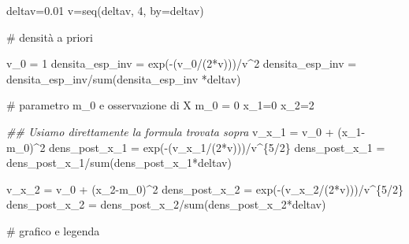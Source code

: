 \documentclass[
  italian,
  letterpaper,
]{book}
\newenvironment{Shaded}{\begin{snugshade}}{\end{snugshade}}
\newcommand{\AttributeTok}[1]{\textcolor[rgb]{0.40,0.45,0.13}{#1}}
\newcommand{\CommentTok}[1]{\textcolor[rgb]{0.37,0.37,0.37}{#1}}
\newcommand{\DecValTok}[1]{\textcolor[rgb]{0.68,0.00,0.00}{#1}}
\newcommand{\DocumentationTok}[1]{\textcolor[rgb]{0.37,0.37,0.37}{\textit{#1}}}
\newcommand{\FloatTok}[1]{\textcolor[rgb]{0.68,0.00,0.00}{#1}}
\newcommand{\FunctionTok}[1]{\textcolor[rgb]{0.28,0.35,0.67}{#1}}
\newcommand{\NormalTok}[1]{\textcolor[rgb]{0.00,0.23,0.31}{#1}}
\newcommand{\OtherTok}[1]{\textcolor[rgb]{0.00,0.23,0.31}{#1}}
\newcommand{\SpecialCharTok}[1]{\textcolor[rgb]{0.37,0.37,0.37}{#1}}
\theoremstyle{definition}
\theoremstyle{remark}
\begin{document}
\begin{Shaded}
\begin{Highlighting}[]
\NormalTok{deltav}\OtherTok{=}\FloatTok{0.01}
\NormalTok{v}\OtherTok{=}\FunctionTok{seq}\NormalTok{(deltav, }\DecValTok{4}\NormalTok{, }\AttributeTok{by=}\NormalTok{deltav)}

\CommentTok{\# densità a priori}

\NormalTok{v\_0 }\OtherTok{=} \DecValTok{1}
\NormalTok{densita\_esp\_inv }\OtherTok{=} \FunctionTok{exp}\NormalTok{(}\SpecialCharTok{{-}}\NormalTok{(v\_0}\SpecialCharTok{/}\NormalTok{(}\DecValTok{2}\SpecialCharTok{*}\NormalTok{v)))}\SpecialCharTok{/}\NormalTok{v}\SpecialCharTok{\^{}}\DecValTok{2}
\NormalTok{densita\_esp\_inv }\OtherTok{=}\NormalTok{ densita\_esp\_inv}\SpecialCharTok{/}\FunctionTok{sum}\NormalTok{(densita\_esp\_inv }\SpecialCharTok{*}\NormalTok{deltav)}


\CommentTok{\# parametro m\_0 e osservazione di X}
\NormalTok{m\_0 }\OtherTok{=} \DecValTok{0}
\NormalTok{x\_1}\OtherTok{=}\DecValTok{0}
\NormalTok{x\_2}\OtherTok{=}\DecValTok{2}

\DocumentationTok{\#\# Usiamo direttamente la formula trovata sopra}
\NormalTok{v\_x\_1 }\OtherTok{=}\NormalTok{ v\_0 }\SpecialCharTok{+}\NormalTok{ (x\_1}\SpecialCharTok{{-}}\NormalTok{m\_0)}\SpecialCharTok{\^{}}\DecValTok{2}
\NormalTok{dens\_post\_x\_1 }\OtherTok{=} \FunctionTok{exp}\NormalTok{(}\SpecialCharTok{{-}}\NormalTok{(v\_x\_1}\SpecialCharTok{/}\NormalTok{(}\DecValTok{2}\SpecialCharTok{*}\NormalTok{v)))}\SpecialCharTok{/}\NormalTok{v}\SpecialCharTok{\^{}}\NormalTok{\{}\DecValTok{5}\SpecialCharTok{/}\DecValTok{2}\NormalTok{\}}
\NormalTok{dens\_post\_x\_1 }\OtherTok{=}\NormalTok{ dens\_post\_x\_1}\SpecialCharTok{/}\FunctionTok{sum}\NormalTok{(dens\_post\_x\_1}\SpecialCharTok{*}\NormalTok{deltav)}

\NormalTok{v\_x\_2 }\OtherTok{=}\NormalTok{ v\_0 }\SpecialCharTok{+}\NormalTok{ (x\_2}\SpecialCharTok{{-}}\NormalTok{m\_0)}\SpecialCharTok{\^{}}\DecValTok{2}
\NormalTok{dens\_post\_x\_2 }\OtherTok{=} \FunctionTok{exp}\NormalTok{(}\SpecialCharTok{{-}}\NormalTok{(v\_x\_2}\SpecialCharTok{/}\NormalTok{(}\DecValTok{2}\SpecialCharTok{*}\NormalTok{v)))}\SpecialCharTok{/}\NormalTok{v}\SpecialCharTok{\^{}}\NormalTok{\{}\DecValTok{5}\SpecialCharTok{/}\DecValTok{2}\NormalTok{\}}
\NormalTok{dens\_post\_x\_2 }\OtherTok{=}\NormalTok{ dens\_post\_x\_2}\SpecialCharTok{/}\FunctionTok{sum}\NormalTok{(dens\_post\_x\_2}\SpecialCharTok{*}\NormalTok{deltav)}

\CommentTok{\# grafico e legenda}


\end{Highlighting}
\end{Shaded}
\end{document}
